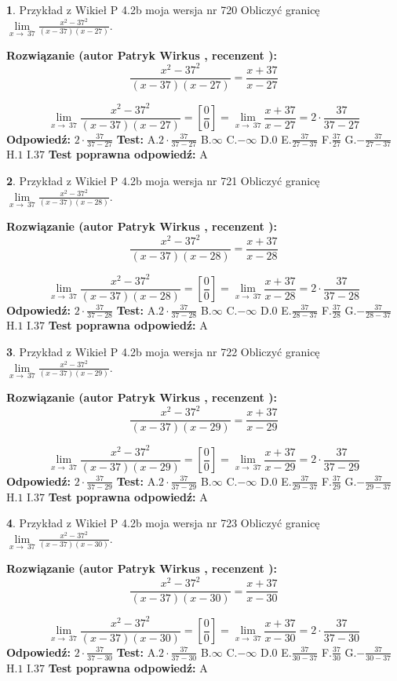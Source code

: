 \documentclass[12pt, a4paper]{article}
\theoremstyle{definition} %
\newtheorem{zad}{}
\newcommand{\zadStart}[1]{\begin{zad}#1\newline}
\newcommand{\zadStop}{\end{zad}}
\newcommand{\rozwStart}[2]{\noindent \textbf{Rozwiązanie (autor #1 , recenzent #2): }\newline}
\newcommand{\rozwStop}{\newline}
\newcommand{\odpStart}{\noindent \textbf{Odpowiedź:}\newline}
\newcommand{\odpStop}{\newline}
\newcommand{\testStart}{\noindent \textbf{Test:}\newline}
\newcommand{\testStop}{\newline}
\newcommand{\kluczStart}{\noindent \textbf{Test poprawna odpowiedź:}\newline}
\newcommand{\kluczStop}{\newline}
\begin{document}
\zadStart{Przykład z Wikieł P 4.2b moja wersja nr 720}
Obliczyć granicę $\lim\limits_{x\to\ 37}\frac{x^{2}-37^{2}}{(x-37)(x-27)}$.
\zadStop
\rozwStart{Patryk Wirkus}{}
$$\frac{x^{2}-37^{2}}{(x-37)(x-27)}=\frac{x+37}{x-27}$$

$$\lim\limits_{x\to\ 37}\frac{x^{2}-37^{2}}{(x-37)(x-27)}=[\frac{0}{0}]=\lim\limits_{x\to\ 37}\frac{x+37}{x-27}=2 \cdot \frac{37}{37-27}$$
\rozwStop
\odpStart
$2 \cdot \frac{37}{37-27}$
\odpStop
\testStart
A.$2 \cdot \frac{37}{37-27}$
B.$\infty$
C.$-\infty$
D.$0$
E.$\frac{37}{27-37}$
F.$\frac{37}{27}$
G.$-\frac{37}{27-37}$
H.$1$
I.$37$
\testStop
\kluczStart
A
\kluczStop



\zadStart{Przykład z Wikieł P 4.2b moja wersja nr 721}
Obliczyć granicę $\lim\limits_{x\to\ 37}\frac{x^{2}-37^{2}}{(x-37)(x-28)}$.
\zadStop
\rozwStart{Patryk Wirkus}{}
$$\frac{x^{2}-37^{2}}{(x-37)(x-28)}=\frac{x+37}{x-28}$$

$$\lim\limits_{x\to\ 37}\frac{x^{2}-37^{2}}{(x-37)(x-28)}=[\frac{0}{0}]=\lim\limits_{x\to\ 37}\frac{x+37}{x-28}=2 \cdot \frac{37}{37-28}$$
\rozwStop
\odpStart
$2 \cdot \frac{37}{37-28}$
\odpStop
\testStart
A.$2 \cdot \frac{37}{37-28}$
B.$\infty$
C.$-\infty$
D.$0$
E.$\frac{37}{28-37}$
F.$\frac{37}{28}$
G.$-\frac{37}{28-37}$
H.$1$
I.$37$
\testStop
\kluczStart
A
\kluczStop



\zadStart{Przykład z Wikieł P 4.2b moja wersja nr 722}
Obliczyć granicę $\lim\limits_{x\to\ 37}\frac{x^{2}-37^{2}}{(x-37)(x-29)}$.
\zadStop
\rozwStart{Patryk Wirkus}{}
$$\frac{x^{2}-37^{2}}{(x-37)(x-29)}=\frac{x+37}{x-29}$$

$$\lim\limits_{x\to\ 37}\frac{x^{2}-37^{2}}{(x-37)(x-29)}=[\frac{0}{0}]=\lim\limits_{x\to\ 37}\frac{x+37}{x-29}=2 \cdot \frac{37}{37-29}$$
\rozwStop
\odpStart
$2 \cdot \frac{37}{37-29}$
\odpStop
\testStart
A.$2 \cdot \frac{37}{37-29}$
B.$\infty$
C.$-\infty$
D.$0$
E.$\frac{37}{29-37}$
F.$\frac{37}{29}$
G.$-\frac{37}{29-37}$
H.$1$
I.$37$
\testStop
\kluczStart
A
\kluczStop



\zadStart{Przykład z Wikieł P 4.2b moja wersja nr 723}
Obliczyć granicę $\lim\limits_{x\to\ 37}\frac{x^{2}-37^{2}}{(x-37)(x-30)}$.
\zadStop
\rozwStart{Patryk Wirkus}{}
$$\frac{x^{2}-37^{2}}{(x-37)(x-30)}=\frac{x+37}{x-30}$$

$$\lim\limits_{x\to\ 37}\frac{x^{2}-37^{2}}{(x-37)(x-30)}=[\frac{0}{0}]=\lim\limits_{x\to\ 37}\frac{x+37}{x-30}=2 \cdot \frac{37}{37-30}$$
\rozwStop
\odpStart
$2 \cdot \frac{37}{37-30}$
\odpStop
\testStart
A.$2 \cdot \frac{37}{37-30}$
B.$\infty$
C.$-\infty$
D.$0$
E.$\frac{37}{30-37}$
F.$\frac{37}{30}$
G.$-\frac{37}{30-37}$
H.$1$
I.$37$
\testStop
\kluczStart
A
\kluczStop
\end{document}
